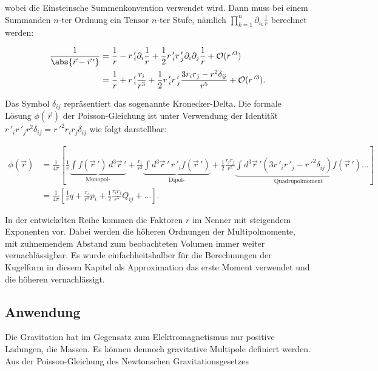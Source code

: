 \noindent
wobei die Einsteinsche Summenkonvention verwendet wird.
Dann muss bei einem Summanden \(n\)-ter Ordnung ein Tensor \(n\)-ter Stufe, nämlich \(\textstyle \prod_{k=1}^{n} \partial_{i_{k}} \frac{1}{r}\) berechnet werden:


\begin{align*}
\frac{1}{\abs{ \vec{r} - \vec{r}\,'}} &= \frac{1}{r} - r\,'_{i} \partial_{i} \frac{1}{r} + \frac{1}{2} r\,'_{i} r\,'_{j} \partial_{i} \partial_{j} \frac{1}{r} + \mathcal{O}(r\,'^{3}) \\
&= \frac{1}{r} + r\,'_{i} \frac{r_{i}}{r^{3}} + \frac{1}{2} r\,'_{i} r\,'_{j} \frac{3 r_{i} r_{j} - r^{2} \delta_{i\!j}}{r^{5}} + \mathcal{O}(r\,'^{3}).
\end{align*}


\noindent
Das Symbol \(\delta_{i\!j}\) repräsentiert das sogenannte Kronecker-Delta.
Die formale Lösung \(\phi (\vec{r})\) der Poisson-Gleichung ist unter Verwendung der Identität \(r\,'_{i} r\,'_{j} r^{2} \delta_{i\!j} = r\,'^{2} r_{i} r_{j} \delta_{i\!j}\) wie folgt darstellbar:


\begin{align*}
\phi (\vec{r}) &= \frac{1}{4\pi} \left[ \frac{1}{r} \underbrace{\int f (\vec{r}\,') \, d^3 \vec{r}\,'}_{\text{Monopol-}} + \frac{r_{i}}{r^{3}} \underbrace{\int d^3 \vec{r}\,' \, r\,'_{i} f (\vec{r}\,')}_{\text{Dipol-}} + \frac{1}{2} \frac{r_{i} r_{j}}{r^{5}} \underbrace{\int d^3 \vec{r}\,' \left( 3 r\,'_{i} r\,'_{j} - r\,'^{2} \delta_{i\!j} \right) f (\vec{r}\,')}_{\text{Quadrupolmoment}} \ldots \right] \\
&= \frac{1}{4\pi} \left[ \frac{1}{r} q + \frac{r_{i}}{r^{3}} p_{i} + \frac{1}{2} \frac{r_{i} r_{j}}{r^{5}} Q_{i\!j} + \ldots \right].
\end{align*}


In der entwickelten Reihe kommen die Faktoren \(r\) im Nenner mit steigendem Exponenten vor.
Dabei werden die höheren Ordnungen der Multipolmomente, mit zuhnemendem Abstand zum beobachteten Volumen immer weiter vernachlässigbar.
Es wurde einfachheitshalber für die Berechnungen der Kugelform in diesem Kapitel als Approximation das erste Moment verwendet und die höheren vernachlässigt.



\subsection{Anwendung
\label{planet:subsection:anwendung}}

Die Gravitation hat im Gegensatz zum Elektromagnetismus nur positive Ladungen, die Massen.
Es können dennoch gravitative Multipole definiert werden.
Aus der Poisson-Gleichung des Newtonschen Gravitationsgesetzes

